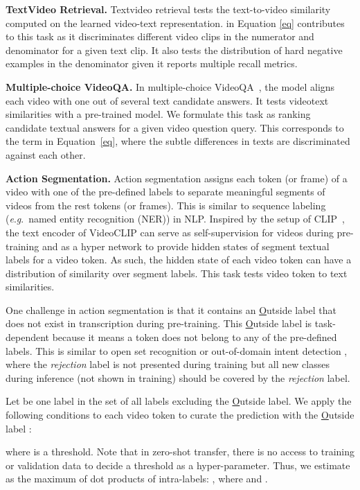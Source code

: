\documentclass[11pt]{article}
\newcommand{\eg}{\textit{e}.\textit{g}.}
\begin{document}
\noindent\textbf{TextVideo Retrieval.}
Textvideo retrieval tests the text-to-video similarity computed on the learned video-text representation. 
 in Equation \ref{eq} contributes to this task as it discriminates different video clips in the numerator and denominator for a given text clip.
It also tests the distribution of hard negative examples in the denominator given it reports multiple recall metrics.

\noindent\textbf{Multiple-choice VideoQA.}
In multiple-choice VideoQA~\cite{yu2018joint}, the model aligns each video with one out of several text candidate answers.
It tests videotext similarities with a pre-trained model. We formulate this task as ranking candidate textual answers for a given video question query.
This corresponds to the  term in Equation~\ref{eq}, where the subtle differences in texts are discriminated against each other.

\noindent\textbf{Action Segmentation.}
\label{sec:seg}
Action segmentation assigns each token (or frame) of a video with one of the pre-defined labels to separate meaningful segments of videos from the rest tokens (or frames).
This is similar to sequence labeling (\eg~named entity recognition (NER)) in NLP.
Inspired by the setup of CLIP~\cite{radford2021learning}, the text encoder of VideoCLIP can serve as self-supervision for videos during pre-training and as a hyper network to provide hidden states of segment textual labels for a video token.
As such, the hidden state of each video token can have a distribution of similarity over segment labels.
This task tests video token to text similarities.

One challenge in action segmentation is that it contains an \underline{O}utside label that does not exist in transcription during pre-training.
This \underline{O}utside label is task-dependent because it means a token does not belong to any of the pre-defined labels.
This is similar to open set recognition \cite{scheirer2012toward} or out-of-domain intent detection \cite{lane2006out}, where the \textit{rejection} label is not presented during training but all new classes during inference (not shown in training) should be covered by the \textit{rejection} label.

Let  be one label in the set of all labels  excluding the \underline{O}utside label. 
We apply the following conditions to each video token  to curate the prediction with the \underline{O}utside label :

where  is a threshold.
Note that in zero-shot transfer, there is no access to training or validation data to decide a threshold as a hyper-parameter.
Thus, we estimate  as the maximum of dot products of intra-labels:
, where  and .
\end{document}
